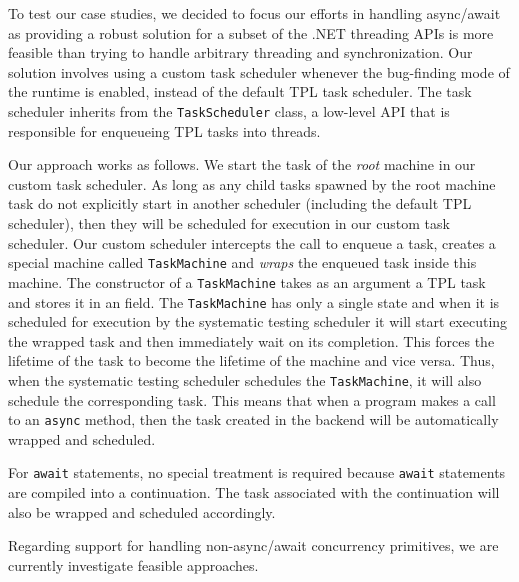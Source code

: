 To test our case studies, we decided to focus our efforts in handling async/await as providing a robust solution for a subset of the .NET threading APIs is more feasible than trying to handle arbitrary threading and synchronization. Our solution involves using a custom task scheduler whenever the bug-finding mode of the \psharp runtime is enabled, instead of the default TPL task scheduler. The \psharp task scheduler inherits from the \texttt{TaskScheduler} class, a low-level API that is responsible for enqueueing TPL tasks into threads.

Our approach works as follows. We start the task of the \emph{root} \psharp machine in our custom task scheduler. As long as any child tasks spawned by the root machine task do not explicitly start in another scheduler (including the default TPL scheduler), then they will be scheduled for execution in our custom task scheduler. Our custom scheduler intercepts the call to enqueue a task, creates a special machine called \texttt{TaskMachine} and \emph{wraps} the enqueued task inside this machine. The constructor of a \texttt{TaskMachine} takes as an argument a TPL task and stores it in an field. The \texttt{TaskMachine} has only a single state and when it is scheduled for execution by the \psharp systematic testing scheduler it will start executing the wrapped task and then immediately wait on its completion. This forces the lifetime of the task to become the lifetime of the machine and vice versa. Thus, when the \psharp systematic testing scheduler schedules the \texttt{TaskMachine}, it will also schedule the corresponding task. This means that when a \psharp program makes a call to an \texttt{async} method, then the task created in the backend will be automatically wrapped and scheduled.

For \texttt{await} statements, no special treatment is required because \texttt{await} statements are compiled into a continuation. The task associated with the continuation will also be wrapped and scheduled accordingly.

Regarding support for handling non-async/await concurrency primitives, we are currently investigate feasible approaches.
